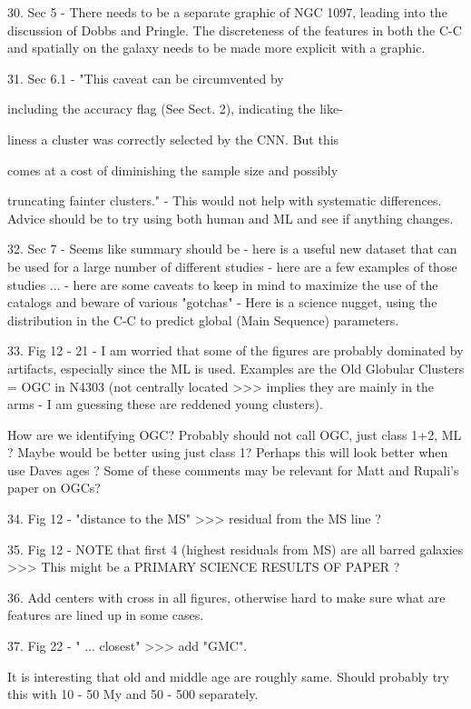  

30. Sec 5 - There needs to be a separate graphic of NGC 1097, leading into the discussion of Dobbs and Pringle. The discreteness of the features in both the C-C and spatially on the  galaxy needs to be made more explicit with a graphic.

 

31. Sec 6.1 - "This caveat can be circumvented by

including the accuracy flag (See Sect. 2), indicating the like-

liness a cluster was correctly selected by the CNN. But this

comes at a cost of diminishing the sample size and possibly

truncating fainter clusters." - This would not help with systematic differences. Advice should be to try using both human and ML and see if anything changes.

 

32. Sec 7 - Seems like summary should be - here is a useful new dataset that can be used for a large number of different studies - here are a few examples of those studies ... - here are some caveats to keep in mind to maximize the use of the catalogs and beware of various "gotchas" - Here is a science nugget, using the distribution in the C-C to predict global (Main Sequence) parameters.

 

33. Fig 12 - 21 - I am worried that  some of the figures are probably dominated by artifacts, especially since the ML is used. Examples are the Old Globular Clusters = OGC in N4303 (not centrally located >>> implies they are mainly in the arms - I am guessing these are reddened young clusters).

 

How are we identifying OGC? Probably should not call OGC, just class 1+2, ML ? Maybe would be better using just class 1? Perhaps this will look better when use Daves ages ? Some of these comments may be relevant for Matt and Rupali's paper on OGCs?

 

34. Fig 12 - "distance to the MS" >>> residual from the MS line ?

 

35. Fig 12 - NOTE that first 4 (highest residuals from MS) are all barred galaxies >>> This might be a PRIMARY SCIENCE RESULTS OF PAPER ?

 

36. Add centers with cross in all figures, otherwise hard to make sure what are features are lined up in some cases.

 

37.  Fig 22 - " ... closest" >>> add "GMC".

 

It is interesting that old and middle age are roughly same. Should probably try this with 10 - 50 My and 50 - 500 separately. 